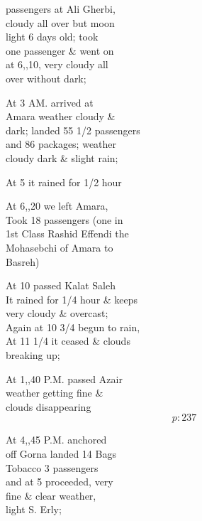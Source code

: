 \documentclass{report}
\begin{document}
	\par{
 	passengers at Ali Gherbi,\ \\cloudy all over but moon\ \\light 6 days old; took\ \\one passenger \& went on\ \\at 6,,10, very cloudy all\ \\over without dark;\ \\
	}

	\par{
 	At 3 AM. arrived at\ \\Amara weather cloudy \&\ \\dark; landed 55 1/2 passengers\ \\and 86 packages; weather\ \\cloudy dark \& slight rain;\ \\
	}

	\par{
 	At 5 it rained for 1/2 hour\ \\
	}

	\par{
 	At 6,,20 we left Amara,\ \\Took 18 passengers (one in\ \\1st Class Rashid Effendi the\ \\Mohasebchi of Amara to\ \\Basreh)\ \\
	}

	\par{
 	At 10 passed Kalat Saleh\ \\It rained for 1/4 hour \& keeps\ \\very cloudy \& overcast;\ \\Again at 10 3/4 begun to rain,\ \\At 11 1/4 it ceased \& clouds\ \\breaking up;\ \\
	}

	\par{
 	At 1,,40 P.M. passed Azair\ \\weather getting fine \&\ \\clouds disappearing\ \\
  \[p: 237 \]

	}



	\par{
 	At 4,,45 P.M. anchored\ \\off Gorna landed 14 Bags\ \\Tobacco 3 passengers\ \\and at 5 proceeded, very\ \\fine \& clear weather,\ \\light S. Erly;\ \\
	}
\end{document}

